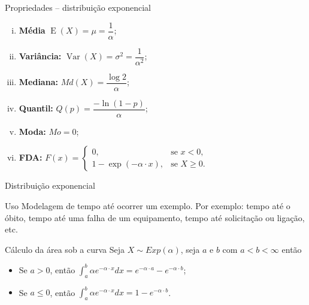 \documentclass[9pt]{beamer}
\DeclareMathOperator{\espe}{E}
\DeclareMathOperator{\vari}{Var}
\begin{document}
\begin{frame}{Propriedades -- distribuição exponencial}
\begin{enumerate}[i.]
 \item \textbf{Média} $\espe(X) = \mu = \dfrac{1}{\alpha}$;
 \vfill
 
 \item \textbf{Variância:} $\vari(X) = \sigma^2 = \dfrac{1}{\alpha^2}$;
 \vfill
 
 \item \textbf{Mediana:} $Md(X) = \dfrac{\log 2}{\alpha}$;
 \vfill
 
 \item \textbf{Quantil:} $Q(p) = \dfrac{-\ln(1-p)}{\alpha}$;
 \vfill
 
 \item \textbf{Moda:} $Mo = 0$;
 \vfill
 
 \item \textbf{FDA:} $F(x) = \begin{cases}
 	0, & \text{se } x < 0,\\
 	1 - \exp(-\alpha \cdot x), & \text{se } X \geq 0.
 \end{cases}$
\end{enumerate}

\end{frame}


\begin{frame}{Distribuição exponencial}
 \begin{block}{Uso}
  Modelagem de tempo até ocorrer um exemplo. Por exemplo: tempo até o óbito, tempo até uma falha de um equipamento, tempo até solicitação ou ligação, etc.
 \end{block} 
\vfill
 
 \begin{block}{Cálculo da área sob a curva}
 Seja $X \sim Exp(\alpha)$, seja $a$ e $b$ com $a < b < \infty$ então
  \begin{itemize}
   \item Se $a > 0$, então $\int_{a}^{b} \alpha e^{-\alpha \cdot x} dx = e^{-\alpha\cdot a} - e^{-\alpha\cdot b}$;
   \vfill
   
   \item Se $a \leq 0$, então $\int_{a}^{b} \alpha e^{-\alpha \cdot x} dx = 1 - e^{-\alpha\cdot b}$.
  \end{itemize}

 \end{block}

\end{frame}
\end{document}
